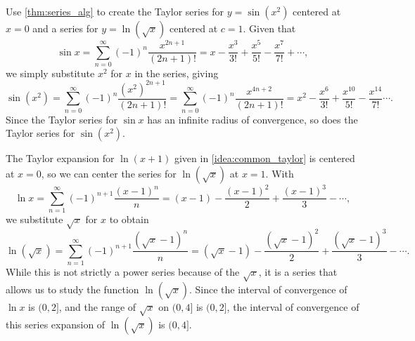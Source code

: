 \begin{example}\label{ex_ts6}%
Use \autoref{thm:series_alg} to create the Taylor series for $y=\sin(x^2)$ centered at $x=0$ and a series for $y=\ln (\sqrt{x})$ centered at $c=1$.
\solution
Given that 
\[\sin x = \sum_{n=0}^\infty (-1)^n\frac{x^{2n+1}}{(2n+1)!} = x-\frac{x^3}{3!}+\frac{x^5}{5!} -\frac{x^7}{7!}+\dotsb,\]
we simply substitute $x^2$ for $x$ in the series, giving
\[
\sin (x^2) = \sum_{n=0}^\infty (-1)^n\frac{(x^2)^{2n+1}}{(2n+1)!} = \sum_{n=0}^\infty (-1)^n\frac{x^{4n+2}}{(2n+1)!} = x^2-\frac{x^6}{3!}+\frac{x^{10}}{5!} -\frac{x^{14}}{7!}\dotsb.
\]
Since the Taylor series for $\sin x$ has an infinite radius of convergence, so does the Taylor series for $\sin(x^2)$.\bigskip

The Taylor expansion for $\ln(x+1)$ given in \autoref{idea:common_taylor} is centered at $x=0$, so we can center the series for $\ln (\sqrt{x})$ at $x=1$.
With 
\[\ln x = \sum_{n=1}^\infty(-1)^{n+1}\frac{(x-1)^n}{n} = (x-1)- \frac{(x-1)^2}{2} +\frac{(x-1)^3}{3}-\dotsb,\]
we substitute $\sqrt{x}$ for $x$ to obtain
\[\ln (\sqrt{x}) = \sum_{n=1}^\infty(-1)^{n+1}\frac{(\sqrt{x}-1)^n}{n} = (\sqrt{x}-1)- \frac{(\sqrt{x}-1)^2}{2} +\frac{(\sqrt{x}-1)^3}{3}-\dotsb.\]
While this is not strictly a power series because of the $\sqrt x$, it is a series that allows us to study the function $\ln(\sqrt{x})$. Since the interval of convergence of $\ln x$ is $(0,2]$, and the range of $\sqrt{x}$ on $(0,4]$ is $(0,2]$, the interval of convergence of this series expansion of $\ln(\sqrt{x})$ is $(0,4]$.
\end{example}

